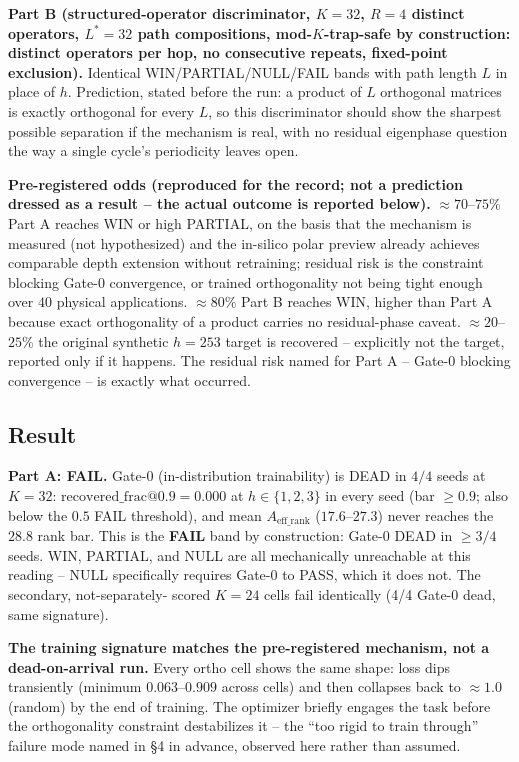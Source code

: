 \textbf{Part B (structured-operator discriminator, $K{=}32$, $R{=}4$
distinct operators, $L^\ast{=}32$ path compositions, mod-$K$-trap-safe by
construction: distinct operators per hop, no consecutive repeats,
fixed-point exclusion).} Identical WIN/PARTIAL/NULL/FAIL bands with path
length $L$ in place of $h$. Prediction, stated before the run: a product
of $L$ orthogonal matrices is exactly orthogonal for every $L$, so this
discriminator should show the sharpest possible separation if the
mechanism is real, with no residual eigenphase question the way a single
cycle's periodicity leaves open.

\textbf{Pre-registered odds (reproduced for the record; not a prediction
dressed as a result -- the actual outcome is reported below).}
$\approx 70$--$75\%$ Part A reaches WIN or high PARTIAL, on the basis that
the mechanism is measured (not hypothesized) and the in-silico polar
preview already achieves comparable depth extension without retraining;
residual risk is the constraint blocking Gate-0 convergence, or trained
orthogonality not being tight enough over $40$ physical applications.
$\approx 80\%$ Part B reaches WIN, higher than Part A because exact
orthogonality of a product carries no residual-phase caveat. $\approx
20$--$25\%$ the original synthetic $h{=}253$ target is recovered --
explicitly not the target, reported only if it happens. The residual risk
named for Part A -- Gate-0 blocking convergence -- is exactly what
occurred. %

\subsection*{Result}

\textbf{Part A: FAIL.} Gate-0 (in-distribution trainability) is DEAD in
$4/4$ seeds at $K{=}32$: $\mathrm{recovered\_frac@0.9} = 0.000$ at
$h \in \{1,2,3\}$ in every seed (bar $\geq 0.9$; also below the $0.5$
FAIL threshold), and mean $A_{\mathrm{eff\_rank}}$ ($17.6$--$27.3$) never
reaches the $28.8$ rank bar. This is the \textbf{FAIL} band by
construction: Gate-0 DEAD in $\geq 3/4$ seeds. WIN, PARTIAL, and NULL are
all mechanically unreachable at this reading -- NULL specifically
requires Gate-0 to PASS, which it does not. The secondary, not-separately-
scored $K{=}24$ cells fail identically (4/4 Gate-0 dead, same signature).

\textbf{The training signature matches the pre-registered mechanism, not
a dead-on-arrival run.} Every ortho cell shows the same shape: loss dips
transiently (minimum $0.063$--$0.909$ across cells) and then collapses
back to $\approx 1.0$ (random) by the end of training. The optimizer
briefly engages the task before the orthogonality constraint destabilizes
it -- the ``too rigid to train through'' failure mode named in \S4 in
advance, observed here rather than assumed.

